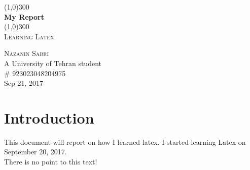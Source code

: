 \documentclass{article}
\begin{document}
\begin{titlepage}
	\begin{center}

	\line(1,0){300}\\
	[0.25in]
	\huge{\bfseries My Report}\\
	[2mm]
	\line(1,0){300}\\
	[0.75cm]
	\textsc{\large Learning Latex}\\
	[10cm]
	\end{center}

	\begin{flushright}
	\textsc{\large Nazanin Sabri\\}
	A University of Tehran student\\
	\# 923023048204975\\
	Sep 21, 2017
	\end{flushright}

\end{titlepage}

\section{Introduction}\label{sec:intro}
This document will report on how I learned latex. I started learning Latex on September 20, 2017.\\ There is no point to this text!\\
\lipsum[1]
\end{document}
